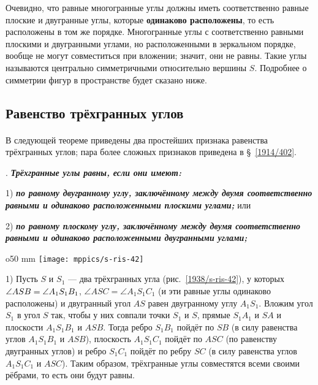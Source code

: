 Очевидно, что равные многогранные углы должны иметь соответственно равные плоские и двугранные углы, которые \textbf{одинаково расположены}, то есть расположены в том же порядке.
Многогранные углы с соответственно равными плоскими и двугранными углами, но расположенными в зеркальном порядке, вообще не могут совместиться при вложении;
значит, они не равны.
Такие углы называются центрально симметричными относительно вершины $S$.
Подробнее о симметрии фигур в пространстве будет сказано ниже.


\subsection*{Равенство трёхгранных углов}

\paragraph{}\label{1938/s52} В следующей теореме приведены два простейших признака равенства трёхгранных углов; пара более сложных признаков приведена в §~\ref{1914/402}.

\medskip

.
\textbf{\emph{Трёхгранные углы равны, если они имеют:}}

1) \textbf{\emph{по равному двугранному углу, заключённому между двумя соответственно равными и одинаково расположенными плоскими углами;}} или

2) \textbf{\emph{по равному плоскому углу, заключённому между двумя соответственно равными и одинаково расположенными двугранными углами;}} 

\begin{wrapfigure}{o}{50 mm}
\vskip-4mm
\centering
\texttt{[image: mppics/s-ris-42]}
\caption{}\label{1938/s-ris-42}
\end{wrapfigure}

1) Пусть $S$ и $S_1$ — два трёхгранных угла (рис.~\ref{1938/s-ris-42}), у которых $\angle ASB\z=\angle A_1S_1B_1$,
$\angle ASC= \angle A_1S_1C_1$ (и эти равные углы одинаково расположены) и двугранный угол $AS$ равен двугранному углу $A_1S_1$.
Вложим угол $S_1$ в угол $S$ так, чтобы у них совпали точки $S_1$ и $S$, прямые $S_1A_1$ и $SA$ и плоскости $A_1S_1B_1$ и $ASB$.
Тогда ребро $S_1B_1$ пойдёт по $SB$ (в силу равенства углов $A_1S_1B_1$ и $ASB$), плоскость $A_1S_1C_1$ пойдёт по $ASC$ (по равенству двугранных углов) и ребро $S_1C_1$ пойдёт по ребру $SC$ (в силу равенства углов $A_1S_1C_1$ и $ASC$).
Таким образом, трёхгранные углы совместятся всеми своими рёбрами, то есть они будут равны.


